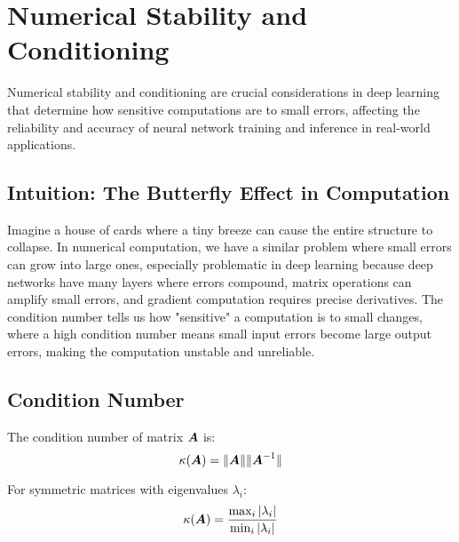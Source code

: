 
\section{Numerical Stability and Conditioning }
\label{sec:numerical-stability}

Numerical stability and conditioning are crucial considerations in deep learning that determine how sensitive computations are to small errors, affecting the reliability and accuracy of neural network training and inference in real-world applications.

\subsection{Intuition: The Butterfly Effect in Computation}

Imagine a house of cards where a tiny breeze can cause the entire structure to collapse. In numerical computation, we have a similar problem where small errors can grow into large ones, especially problematic in deep learning because deep networks have many layers where errors compound, matrix operations can amplify small errors, and gradient computation requires precise derivatives. The condition number tells us how "sensitive" a computation is to small changes, where a high condition number means small input errors become large output errors, making the computation unstable and unreliable.

\subsection{Condition Number}

\begin{definition}
The condition number of matrix $\boldsymbol{A}$ is:
\begin{equation}
\kappa(\boldsymbol{A}) = \|\boldsymbol{A}\| \|\boldsymbol{A}^{-1}\|
\end{equation}
\end{definition}

\begin{definition}
For symmetric matrices with eigenvalues $\lambda_i$:
\begin{equation}
\kappa(\boldsymbol{A}) = \frac{\max_i |\lambda_i|}{\min_i |\lambda_i|}
\end{equation}
\end{definition}

